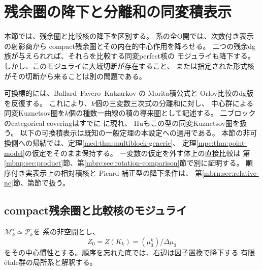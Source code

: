 \section{残余圏の降下と分離和の同変積表示}
\label{mbrd:sec:residual-descent}

本節では、残余圏と比較核の降下を区別する。
系の全O開では、次数付き表示の射影商から
compact残余圏とその内在的中心作用を降ろせる。
二つの残余dg族が与えられれば、それらを比較する同変perfect核の
モジュライも降下する。しかし、このモジュライに大域切断が存在すること、
または指定された形式核がその切断から来ることは別の問題である。

可換標的には、Ballard--Favero--Katzarkov の
Morita積公式\cite[Definition~3.50, Corollary~5.18]{NFBFKKernels}と
Orlov比較のdg版\cite[Theorem~6.13]{NFBFKKernels}を反復する。
これにより、$k$個の三変数三次式の分離和に対し、
中心群による同変Kuznetsov圏を$k$個の種数一曲線の積の導来圏として記述する。
二ブロックのcategorical coveringはすでに
\cite[Example~4.7]{MBRDBFKFurther}に現れ、
Hu\cite[Theorems~0.1, 5.8]{TBHu}もこの型の同変Kuznetsov圏を扱う。
以下の可換積表示は既知の一般定理の本設定への適用である。
本節の非可換側への帰結では、定理\ref{med:thm:multiblock-generic}、
定理\ref{mpc:thm:point-model}の仮定をそのまま保持する。
一変数の仮定を外す体上の直接比較は
第\ref{mbnp:sec:product}節、第\ref{mbrc:sec:rotation-comparison}節で別に証明する。
順序付き実表示上の相対積核と Picard 補正型の降下条件は、
第\ref{mbrn:sec:relative-nc}節、第節で扱う。

\subsection{compact残余圏と比較核のモジュライ}

$\mathcal M_k^\circ\simeq\mathcal P_k^\circ$を
系の非空開とし、
\[
 Z_0=Z(K_k)=(\mu_3^k)/\Delta\mu_3
\]
をその中心慣性とする。順序を忘れた底では、右辺は因子置換で降下する
有限\'etale群の局所系と解釈する。

